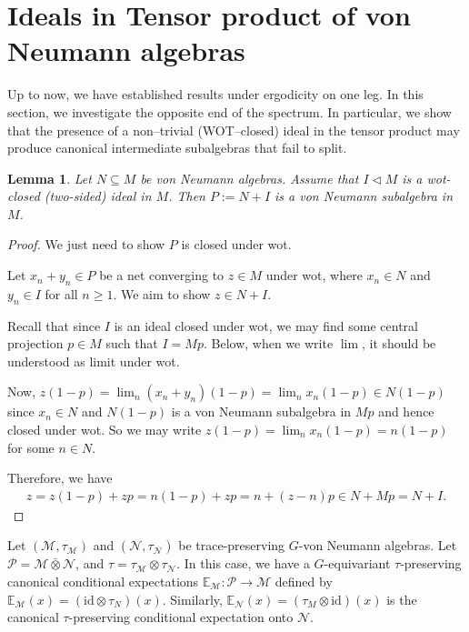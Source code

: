 \documentclass[12pt]{amsart}
\newtheorem{lemma}[thm]{Lemma}
\theoremstyle{definition}
\begin{document}
\section{Ideals in Tensor product of von Neumann algebras}
\label{sec:obstruction}
Up to now, we have established  results under
ergodicity on one leg. In this section, we investigate the
opposite end of the spectrum. In particular,  we show that the presence of a non–trivial (WOT–closed) ideal in the
tensor product may produce canonical intermediate subalgebras that fail to split.
\begin{lemma}
\label{closedinv}
Let $N\subseteq M$ be von Neumann algebras. Assume that $I\lhd M$ is a wot-closed (two-sided) ideal in $M$. Then $P:=N+I$ is a von Neumann subalgebra in $M$.
\end{lemma} 
\begin{proof}
We just need to show $P$ is closed under wot.

Let $x_n+y_n\in P$ be a net converging to $z\in M$ under wot, where $x_n\in N$ and $y_n\in I$ for all $n\geq 1$. We aim to show $z\in N+I$.

Recall that since $I$ is an ideal closed under wot, we may find some central projection $p\in M$ such that $I=Mp$. Below, when we write $\lim$, it should be understood as limit under wot.

Now, $z(1-p)=\lim_n(x_n+y_n)(1-p)=\lim_nx_n(1-p)\in N(1-p)$ since $x_n\in N$ and $N(1-p)$ is a von Neumann subalgebra in $Mp$ and hence closed under wot.
So we may write $z(1-p)=\lim_nx_n(1-p)=n(1-p)$ for some $n\in N$.


Therefore, we have 
\begin{align*}
    z=z(1-p)+zp=n(1-p)+zp=n+(z-n)p\in N+Mp=N+I.
\end{align*}
\end{proof}
Let $(\mathcal{M},\tau_{\mathcal{M}})$ and $(\mathcal{N},\tau_{\mathcal{N}})$ be trace-preserving $G$-von Neumann algebras. Let $\mathcal{P}=\mathcal{M}\bar{\otimes}\mathcal{N}$, and $\tau=\tau_{\mathcal{M}}\otimes\tau_{\mathcal{N}}$. In this case, we have a $G$-equivariant $\tau$-preserving canonical conditional expectations $\mathbb{E}_{\mathcal{M}}:\mathcal{P}\to\mathcal{M}$ defined by $\mathbb{E}_{\mathcal{M}}(x)=(\text{id}\otimes\tau_N)(x)$. Similarly, $\mathbb{E}_{\mathcal{N}}(x)=(\tau_M\otimes\text{id})(x)$ is the canonical $\tau$-preserving conditional expectation onto $\mathcal{N}$.
\end{document}
